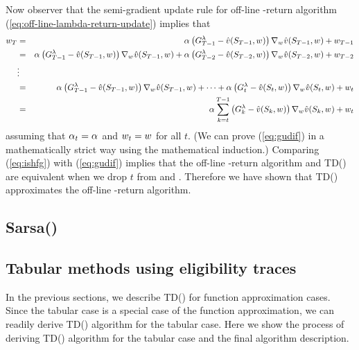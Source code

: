 Now observer that the semi-gradient update rule for off-line \tdparam-return algorithm
(\ref{eq:off-line-lambda-return-update}) implies that
\begin{eqnarray}
\nonumber
{w_{T}}
&=& \alpha_{} \left( G^{\lambda}_{T-1} - \hat{v}(S_{T-1}, {w_{}}) \right) \nabla_{{w_{}}} \hat{v}(S_{T-1}, {w_{}})
+ {w_{T-1}}
\\
\nonumber
&=&
\alpha_{} \left( G^{\lambda}_{T-1} - \hat{v}(S_{T-1}, {w_{}}) \right) \nabla_{{w_{}}} \hat{v}(S_{T-1}, {w_{}})
+ \alpha_{} \left( G^{\lambda}_{T-2} - \hat{v}(S_{T-2}, {w_{}}) \right) \nabla_{{w_{}}} \hat{v}(S_{T-2}, {w_{}})
+ {w_{T-2}}
\\
\nonumber
&\vdots&
\\
\nonumber
&=&
\alpha_{} \left( G^{\lambda}_{T-1} - \hat{v}(S_{T-1}, {w_{}}) \right) \nabla_{{w_{}}} \hat{v}(S_{T-1}, {w_{}})
+ \cdots
+ \alpha_{} \left( G^{\lambda}_{t} - \hat{v}(S_{t}, {w_{}}) \right) \nabla_{{w_{}}} \hat{v}(S_{t}, {w_{}})
+ {w_{t}}
\\
&=& \alpha_{} \sum_{k=t}^{T-1}
\left( G^{\lambda}_{k} - \hat{v}(S_{k}, {w_{}}) \right)
\nabla_{{w_{}}} \hat{v}(S_{k},{w_{}})
+ {w_{t}}
\label{eq:gudif}
\end{eqnarray}
assuming that $\alpha_{t} = \alpha_{}$ and ${w_{t}}={w_{}}$ for all $t$.
(We can prove (\ref{eq:gudif}) in a mathematically strict way using the mathematical induction.)
Comparing (\ref{eq:ishfg}) with (\ref{eq:gudif}) implies that
the off-line \tdparam-return algorithm and TD(\tdparam) are equivalent
when we drop $t$ from  and .
Therefore we have shown that TD(\tdparam) approximates the off-line \tdparam-return algorithm.

\subsection{Sarsa(\tdparam)}


\subsection{Tabular methods using eligibility traces}

In the previous sections, we describe TD(\tdparam) for function approximation cases.
Since the tabular case is a special case of the function approximation,
we can readily derive TD(\tdparam) algorithm for the tabular case.
Here we show the process of deriving TD(\tdparam) algorithm for the tabular case
and the final algorithm description.

